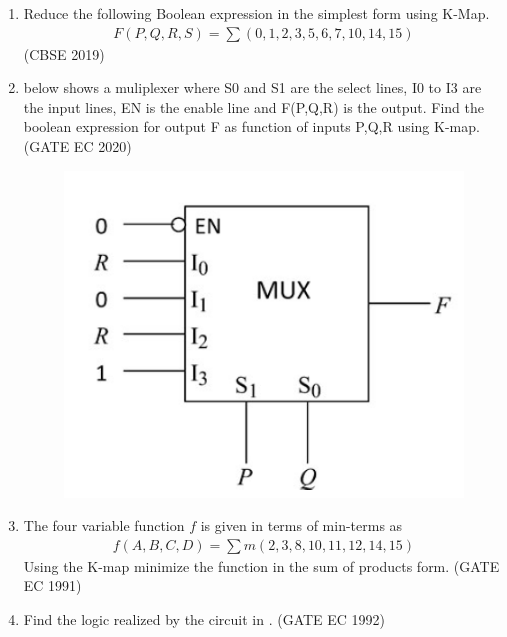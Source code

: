 \begin{enumerate}[label=\arabic*.,ref=\theenumi]
\item 
	Reduce the following Boolean expression in the simplest form using K-Map.
		\begin{align}
F(P,Q,R,S) = \sum (0,1,2,3,5,6,7,10,14,15)
		\end{align}
\hfill (CBSE 2019)
\label{prob:2019/c/6/d}
%
\item {} below shows a muliplexer where S0 and S1 are the select lines, I0 to I3 are the input lines, EN is the enable line and F(P,Q,R) is the output. Find the boolean expression for output F as function of inputs P,Q,R using K-map. 
\hfill (GATE EC 2020)
%
\label{prob:2020/gate/ec/10}
\begin{figure}[!ht]
\centering
	\includegraphics[width=1\columnwidth]{figs/2020-gate-ec-10.png}
\caption{}
\label{fig:2020/gate/ec/10}
\end{figure}
%
\item
	The four variable function $f$ is given in terms of min-terms as
		\begin{align}
	    f(A,B,C,D) = \sum m(2,3,8,10,11,12,14,15)
\label{eq:1991/gate/ec/9}
		\end{align}
	    Using the K-map minimize the function in the sum of products form. 
\label{prob:1991/gate/ec/9}
\hfill (GATE EC 1991)
\item Find the logic realized by the circuit in  
.
\hfill (GATE EC 1992)
\label{prob:1992/gate/ec/1/22}
\begin{figure}[!ht]
\centering

\end{figure}
\end{enumerate}

